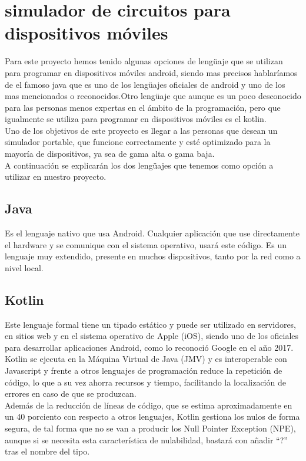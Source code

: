 \documentclass[journal]{IEEEtran}
\begin{document}
\section{simulador de circuitos para dispositivos móviles}
Para este proyecto hemos tenido algunas opciones de lengüaje que se utilizan para programar en dispositivos móviles android, siendo mas precisos hablaríamos de el famoso java que es uno de los lengüajes oficiales de android y uno de los mas mencionados o reconocidos.Otro lengüaje que aunque es un poco desconocido para las personas menos expertas en el ámbito de la programación, pero que igualmente se utiliza para programar en dispositivos móviles es el kotlin.\\
Uno de los objetivos de este proyecto es llegar a las personas que desean un simulador portable, que funcione correctamente y esté optimizado para la mayoría de dispositivos, ya sea de gama alta o gama baja.\\
A continuación se explicarán los dos lengüajes que tenemos como opción a utilizar en nuestro proyecto.

\subsection{Java}
Es el lenguaje nativo que usa Android. Cualquier aplicación que use directamente el hardware y se comunique con el sistema operativo, usará este código. Es un lenguaje muy extendido, presente en muchos dispositivos, tanto por la red como a nivel local.\\

\subsection{Kotlin}
Este lenguaje formal tiene un tipado estático y puede ser utilizado en servidores, en sitios web y en el sistema operativo de Apple (iOS), siendo uno de los oficiales para desarrollar aplicaciones Android, como lo reconoció Google en el año 2017.\\

Kotlin se ejecuta en la Máquina Virtual de Java (JMV) y es interoperable con Javascript y frente a otros lenguajes de programación reduce la repetición de código, lo que a su vez ahorra recursos y tiempo, facilitando la localización de errores en caso de que se produzcan.\\

Además de la reducción de líneas de código, que se estima aproximadamente en un 40 porciento con respecto a otros lenguajes, Kotlin gestiona los nulos de forma segura, de tal forma que no se van a producir los Null Pointer Exception (NPE), aunque si se necesita esta característica de nulabilidad, bastará con añadir “?” tras el nombre del tipo.\\
\end{document}
